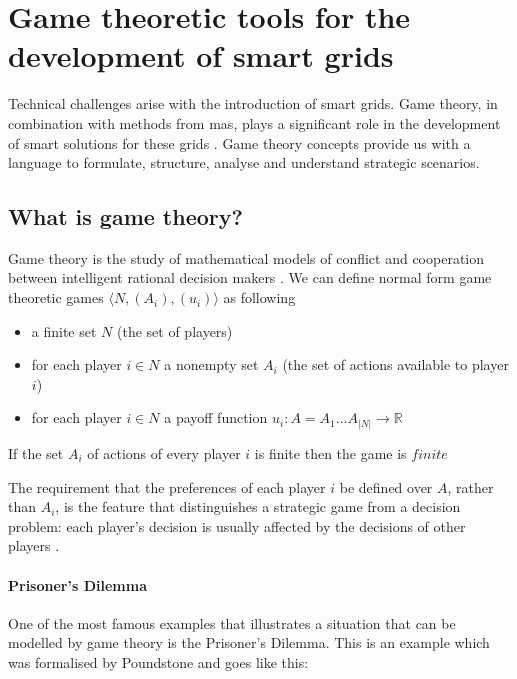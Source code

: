 \section{Game theoretic tools for the development of smart grids} \label{gametheory}
Technical challenges arise with the introduction of smart grids. Game theory, in combination with methods from \ac{mas}, plays a significant role in the development of smart solutions for these grids \cite{keypaper}. Game theory concepts provide us with a language to formulate, structure, analyse and understand strategic scenarios.

\subsection{What is game theory?}
Game theory is the study of mathematical models of conflict and cooperation between intelligent rational decision makers \cite{myerson2013game}.
We can define normal form game theoretic games $\langle N, (A_i), (u_i) \rangle$ as following
\begin{itemize}
    \item a finite set $N$ (the set of players)
    \item for each player $i \in N$ a nonempty set $A_i$ (the set of actions available to player $i$)
    \item for each player $i \in N$ a payoff function $u_i: A = A_1 \ldots A_{|N|} \rightarrow \mathbb{R}$
\end{itemize}

If the set $A_i$ of actions of every player $i$ is finite then the game is $finite$

The requirement that the preferences of each player $i$ be defined over $A$, rather than $A_{i}$, is the feature that distinguishes a strategic game from a decision problem: each player's decision is usually affected by the decisions of other players \cite{CourseInGameTheory}.

\paragraph{Prisoner's Dilemma}
One of the most famous examples that illustrates a situation that can be modelled by game theory is the Prisoner's Dilemma. This is an example which was formalised by Poundstone \cite{poundstone} and goes like this: 

